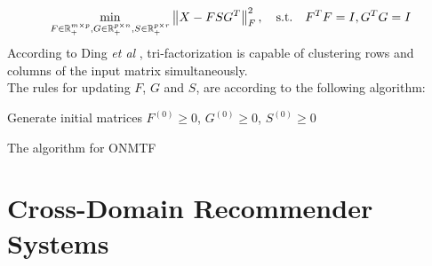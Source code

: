 \begin{equation*}
\min_{F \in \mathbb{R}^{m \times p}_+, G \in \mathbb{R}^{p \times n}_+, S \in \mathbb{R}^{p \times r}_+} \left\lVert X - F S G^T\right\rVert_F^2, \quad \text{s.t.} \quad F^TF = I, G^TG = I
\end{equation*}
According to Ding \textit{et al} \cite{10.1145/1150402.1150420}, tri-factorization is capable of clustering rows and columns of the input matrix simultaneously.\\
The rules for updating $F$, $G$ and $S$, are according to the following algorithm:
\vskip 0.7cm
\begin{algorithm}[H]
Generate initial matrices $F^{(0)} \geq 0$, $G^{(0)} \geq 0$, $S^{(0)} \geq 0$\;
\caption{The algorithm for ONMTF}
\end{algorithm}



\section{Cross-Domain Recommender Systems}

